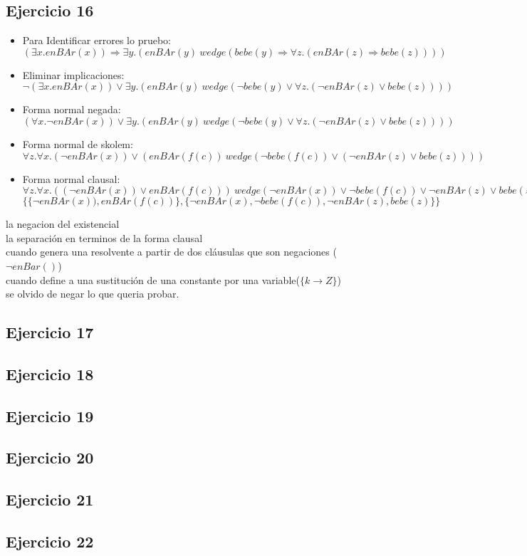 \documentclass[10pt,a4paper]{article}
\begin{document}
  \subsection{Ejercicio 16}
	\begin{itemize}
	    \item Para Identificar errores lo pruebo: $(\exists x. enBAr(x)) \Rightarrow \exists y. ( enBAr(y) \ wedge ( bebe(y) \Rightarrow \forall z. ( enBAr(z) \Rightarrow bebe(z) ) ) )$
	    \item Eliminar implicaciones: $\neg (\exists x. enBAr(x)) \vee \exists y. ( enBAr(y) \ wedge (\neg bebe(y) \vee \forall z. ( \neg enBAr(z) \vee bebe(z) ) ) )$
	    \item Forma normal negada: $(\forall x. \neg enBAr(x)) \vee \exists y. ( enBAr(y) \ wedge (\neg bebe(y) \vee \forall z. ( \neg enBAr(z) \vee bebe(z) ) ) )$
	    \item Forma normal de skolem: $\forall z. \forall x. (\neg enBAr(x)) \vee ( enBAr(f(c)) \ wedge (\neg bebe(f(c)) \vee ( \neg enBAr(z) \vee bebe(z) ) ) )$
	    \item Forma normal clausal: $\forall z. \forall x. ((\neg enBAr(x)) \vee enBAr(f(c))) \ wedge (\neg enBAr(x)) \vee \neg bebe(f(c)) \vee \neg enBAr(z) \vee bebe(z) ) )$ \\
	    $\{\{\neg enBAr(x)), enBAr(f(c))\},\{\neg enBAr(x), \neg bebe(f(c)), \neg enBAr(z), bebe(z)\}\}$
	\end{itemize}
	 la negacion del existencial \\
	 la separación en terminos de la forma clausal \\
	 cuando genera una resolvente a partir de dos cláusulas que son negaciones ($\neg enBar()$) \\
	 cuando define a una sustitución de una constante por una variable($\{k \rightarrow Z\}$) \\
	 se olvido de negar lo que queria probar.
  \subsection{Ejercicio 17}
  \subsection{Ejercicio 18}
  \subsection{Ejercicio 19}
  \subsection{Ejercicio 20}
  \subsection{Ejercicio 21}
  \subsection{Ejercicio 22}
\end{document}
